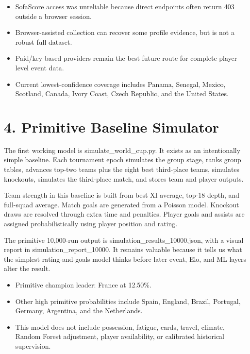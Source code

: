 \documentclass[10pt]{article}
\begin{document}
\begin{itemize}
  \item SofaScore access was unreliable because direct endpoints often return 403 outside a browser session.
  \item Browser-assisted collection can recover some profile evidence, but is not a robust full dataset.
  \item Paid/key-based providers remain the best future route for complete player-level event data.
  \item Current lowest-confidence coverage includes Panama, Senegal, Mexico, Scotland, Canada, Ivory Coast, Czech Republic, and the United States.
\end{itemize}

\section{4. Primitive Baseline Simulator}

The first working model is simulate\_world\_cup.py. It exists as an intentionally simple baseline. Each tournament epoch simulates the group stage, ranks group tables, advances top-two teams plus the eight best third-place teams, simulates knockouts, simulates the third-place match, and stores team and player outputs.

Team strength in this baseline is built from best XI average, top-18 depth, and full-squad average. Match goals are generated from a Poisson model. Knockout draws are resolved through extra time and penalties. Player goals and assists are assigned probabilistically using player position and rating.

The primitive 10,000-run output is simulation\_results\_10000.json, with a visual report in simulation\_report\_10000. It remains valuable because it tells us what the simplest rating-and-goals model thinks before later event, Elo, and ML layers alter the result.

\begin{itemize}
  \item Primitive champion leader: France at 12.50\%.
  \item Other high primitive probabilities include Spain, England, Brazil, Portugal, Germany, Argentina, and the Netherlands.
  \item This model does not include possession, fatigue, cards, travel, climate, Random Forest adjustment, player availability, or calibrated historical supervision.
\end{itemize}
\end{document}
